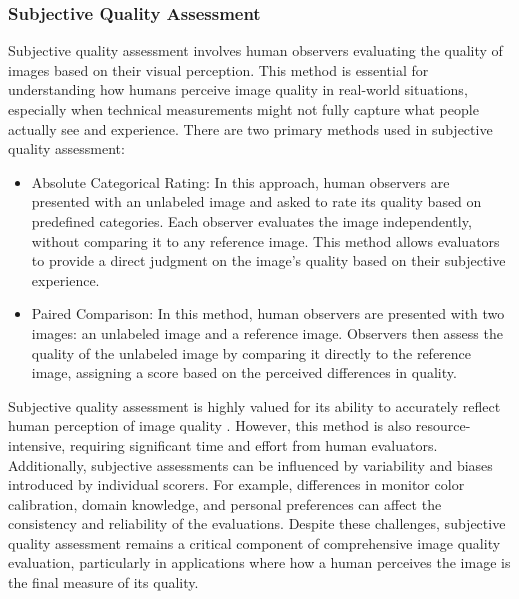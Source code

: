 \subsubsection{Subjective Quality Assessment}
\label{subsub:SubjectiveQualityAssessment}
Subjective quality assessment involves human observers evaluating the quality of images based on their visual perception. This method is essential for understanding how humans perceive image quality in real-world situations, especially when technical measurements might not fully capture what people actually see and experience. There are two primary methods used in subjective quality assessment:\par
\begin{itemize}
    \item Absolute Categorical Rating:   In this approach, human observers are presented with an unlabeled image and asked to rate its quality based on predefined categories. Each observer evaluates the image independently, without comparing it to any reference image. This method allows evaluators to provide a direct judgment on the image’s quality based on their subjective experience.
    \item Paired Comparison:  In this method, human observers are presented with two images: an unlabeled image and a reference image. Observers then assess the quality of the unlabeled image by comparing it directly to the reference image, assigning a score based on the perceived differences in quality.
\end{itemize}
Subjective quality assessment is highly valued for its ability to accurately reflect human perception of image quality \autocite{D}. However, this method is also resource-intensive, requiring significant time and effort from human evaluators. Additionally, subjective assessments can be influenced by variability and biases introduced by individual scorers. For example, differences in monitor color calibration, domain knowledge, and personal preferences can affect the consistency and reliability of the evaluations. Despite these challenges, subjective quality assessment remains a critical component of comprehensive image quality evaluation, particularly in applications where how a human perceives the image is the final measure of its quality. \par


